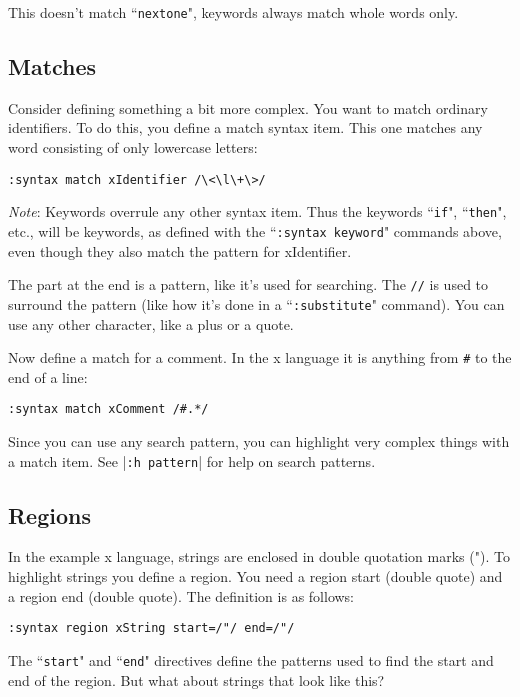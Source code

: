 This doesn't match ``\texttt{nextone}", keywords always match whole words only.
\subsection{Matches}
Consider defining something a bit more complex.
You want to match ordinary identifiers.
To do this, you define a match syntax item.
This one matches any word consisting of only lowercase letters:

\begin{Verbatim}[samepage=true]
 :syntax match xIdentifier /\<\l\+\>/
\end{Verbatim}

\emph{Note}: Keywords overrule any other syntax item.
Thus the keywords ``\texttt{if}", ``\texttt{then}", etc., will be keywords, as defined with the ``\texttt{:syntax keyword}" commands above, even though they also match the pattern for xIdentifier.

The part at the end is a pattern, like it's used for searching.
The \texttt{//} is used to surround the pattern (like how it's done in a ``\texttt{:substitute}" command).
You can use any other character, like a plus or a quote.

Now define a match for a comment.
In the x language it is anything from \texttt{\#} to the end of a line:

\begin{Verbatim}[samepage=true]
 :syntax match xComment /#.*/
\end{Verbatim}

Since you can use any search pattern, you can highlight very complex things with a match item.
See |\texttt{:h pattern}| for help on search patterns.
\subsection{Regions}

In the example x language, strings are enclosed in double quotation marks (").
To highlight strings you define a region.
You need a region start (double quote) and a region end (double quote).
The definition is as follows:

\begin{Verbatim}[samepage=true]
 :syntax region xString start=/"/ end=/"/
\end{Verbatim}

The ``\texttt{start}" and ``\texttt{end}" directives define the patterns used to find the start and end of the region.
But what about strings that look like this?

